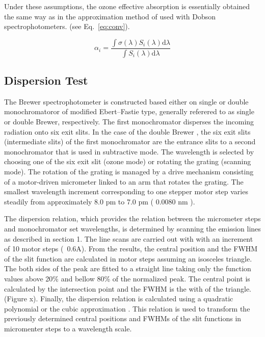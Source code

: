 \documentclass[acp, manuscript]{copernicus}
\begin{document}
Under these assumptions, the ozone effective absorption is essentially obtained the same way as in the approximation method of \citet{Bernhard2005} used with Dobson spectrophotometers. (see Eq.~\ref{eq:conv}).


      \begin{equation}
      \label{eq:conv}
            \alpha_i = \frac{\int \sigma(\lambda) S_i(\lambda) \mbox{d}\lambda}{\int S_i(\lambda) \mbox{d}\lambda}
      \end{equation}


\subsection{Dispersion Test}

The Brewer spectrophotometer is constructed based either on single or double monochromatoror of modified Ebert–Fastie type, generally referered to as single or double Brewer, respectively. The first monochromator disperses the incoming radiation onto six exit slits. In the case of the double Brewer , the six exit slits  (intermediate slits) of the first monochromator are the entrance slits to a second monochromator that is used in subtractive mode. The wavelength is selected by choosing one of the six exit slit (ozone mode) or rotating the grating (scanning mode). The rotation of the grating is managed by a drive mechanism consisting of a motor-driven micrometer linked to an arm that rotates the grating. The smallest wavelength increment corresponding to one stepper motor step varies steadily from approximately 8.0 pm to 7.0 pm ( 0.0080 \unit{nm} ). 

The dispersion relation, which provides the  relation between the micrometer steps and monochromator set wavelengths, is determined by scanning the emission lines as described in section 1. The line scans are carried out with with an increment of 10 motor steps (~0.6A). From the results, the central position and the FWHM of the slit function are calculated in  motor steps assuming an isosceles triangle. The both sides of the peak are  fitted to a straight line taking only the function values above 20\%  and bellow 80\% of the normalized peak. The central point is calculated by the intersection point and the FWHM is the with of the triangle. (Figure x). Finally, the dispersion relation is calculated using a quadratic polynomial or the cubic approximation \citep{Grobner1998}. This relation is used to transform the previously determined central positions and FWHMs of the slit functions in micromenter steps to a wavelength scale.
\end{document}
